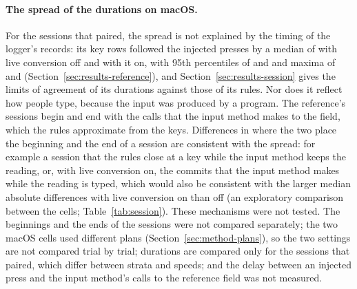 \paragraph{The spread of the durations on macOS.} For the sessions that paired, the spread is not explained by the
timing of the logger's records: its key rows followed the injected presses by a median of
 with live conversion off and
 with it on, with 95th percentiles of
 and  and maxima of
 and 
(Section~\ref{sec:results-reference}), and Section~\ref{sec:results-session} gives the limits of agreement of its
durations against those of its rules. Nor does it reflect how people type, because the input was produced by a
program. The reference's sessions begin and end with the calls that the input method makes to the field, which the
rules approximate from the keys. Differences in where the two place the beginning and the end of a session are
consistent with the spread: for example a session that the rules close at a key while the input method keeps the
reading, or, with live conversion on, the commits that the input method makes while the reading is typed, which would
also be consistent with the larger median absolute differences with live conversion on than off (an exploratory
comparison between the cells; Table~\ref{tab:session}). These mechanisms were not tested. The beginnings and the ends
of the sessions were not compared separately; the two macOS cells used different plans
(Section~\ref{sec:method-plans}), so the two settings are not compared trial by trial; durations are compared only for
the sessions that paired, which differ between strata and speeds; and the delay between an injected press and the
input method's calls to the reference field was not measured.

